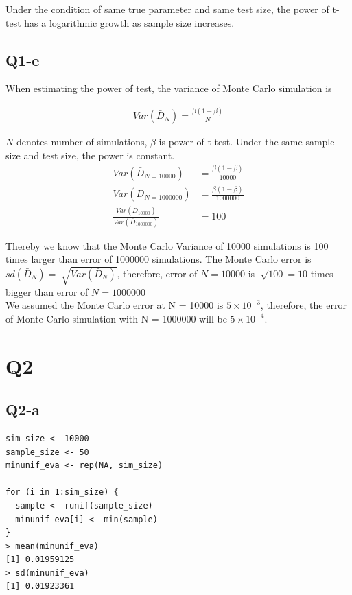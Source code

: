 \documentclass[12pt,letterpaper]{article}
\begin{document}
\noindent Under the condition of same true parameter and same test size, the power of t-test has a logarithmic  growth as sample size increases. 

\subsection*{Q1-e}
\noindent When estimating the power of test, the variance of Monte Carlo  simulation is

\begin{align*}
Var(\bar{D}_N) = \frac{\beta (1 - \beta)}{N}
\end{align*}

\noindent $N$ denotes number of simulations, $\beta$ is power of t-test. Under the same sample size and test size, the power is constant.  \\

\begin{align*}
Var(\bar{D}_{N=10000}) &= \frac{\beta (1 - \beta)}{10000}  \\
Var(\bar{D}_{N=1000000}) &= \frac{\beta (1 - \beta)}{1000000} \\
\frac{Var(\bar{D}_{10000})}{Var(\bar{D}_{1000000})} &= 100
\end{align*}

\noindent Thereby we know that the Monte Carlo Variance of 10000 simulations is 100 times larger than error of 1000000 simulations. The Monte Carlo error is $sd(\bar{D}_N) = \sqrt[]{Var(\bar{D}_N)}$, therefore, error of $N=10000$ is $\sqrt[]{100} = 10$ times bigger than error of $N=1000000$\\

\noindent We assumed the Monte Carlo error at N = 10000 is $5 \times 10^{-3}$, therefore, the error of Monte Carlo simulation with N = 1000000 will be $5 \times 10^{-4}$.

\section*{Q2}
\subsection*{Q2-a}

\begin{verbatim}
sim_size <- 10000
sample_size <- 50
minunif_eva <- rep(NA, sim_size)

for (i in 1:sim_size) {
  sample <- runif(sample_size)
  minunif_eva[i] <- min(sample)
}
> mean(minunif_eva)
[1] 0.01959125
> sd(minunif_eva)
[1] 0.01923361
\end{verbatim}
\end{document}

